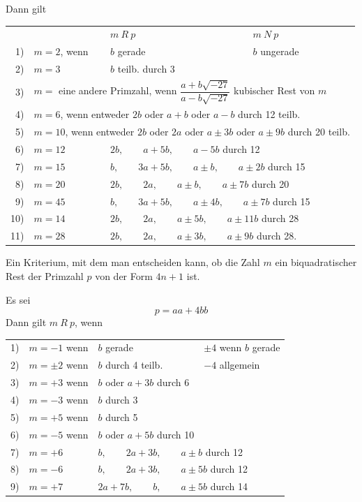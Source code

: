\noindent\unskip{}Dann gilt
\begin{center}\footnotesize\setlength{\tabcolsep}{3pt}
\begin{tabular}{@{}rlll@{}}
& &$m\ R\ p$&$m\ N\ p$\\
1)&$m=2$, wenn&$b$ gerade&$b$ ungerade\\
2)&$m=3$&$b$ teilb. durch 3&\\
3)&\multicolumn{3}{l}{$m={}$ eine andere Primzahl, wenn $\dfrac{a+b\sqrt{-27}}{a-b\sqrt{-27}}$ kubischer Rest von $m$}\\[5pt]
4)&\multicolumn{3}{l}{$m=6$, wenn entweder $2b$ oder $a+b$ oder $a-b$ durch 12 teilb.}\\
5)&\multicolumn{3}{l}{$m=10$, wenn entweder $2b$ oder $2a$ oder $a\pm3b$ oder $a\pm9b$ durch 20 teilb.}\\
6)&$m=12$&\multicolumn{2}{l}{$2b,\qquad a+5b,\qquad a-5b$ durch 12}\\
7)&$m=15$&\multicolumn{2}{l}{$b,\qquad 3a+5b,\qquad a\pm b,\qquad a\pm2b$ durch 15}\\
8)&$m=20$&\multicolumn{2}{l}{$2b,\qquad2a,\qquad a\pm b,\qquad a\pm7b$ durch 20}\\
9)&$m=45$&\multicolumn{2}{l}{$b,\qquad3a+5b,\qquad a\pm4b,\qquad a\pm7b$ durch 15}\\
10)&$m=14$&\multicolumn{2}{l}{$2b,\qquad2a,\qquad a\pm5b,\qquad a\pm11b$ durch 28}\\
11)&$m=28$&\multicolumn{2}{l}{$2b,\qquad2a,\qquad a\pm3b,\qquad a\pm9b$ durch 28.}
\end{tabular}\end{center}
\medskip
\par\noindent\hspace*{\parindent}Ein Kriterium, mit dem man entscheiden kann, ob die Zahl $m$ ein biquadratischer Rest der Primzahl $p$ von der Form $4n+1$ ist.

Es sei
\[p=aa+4bb\]
\noindent Dann gilt $m\ R\ p$, wenn
\begin{center}\small\setlength{\tabcolsep}{3pt}\begin{tabular}{@{}rlll@{}}
1)&$m=-1$ wenn&$b$ gerade&$\pm4$ wenn $b$ gerade\\
2)&$m=\pm2$ wenn&$b$ durch 4 teilb.&$-4$ allgemein\\
3)&$m=+3$ wenn&$b$ oder $a+3b$ durch 6&\\
4)&$m=-3$ wenn&$b$ durch 3&\\
5)&$m=+5$ wenn&$b$ durch 5&\\
6)&$m=-5$ wenn&$b$ oder $a+5b$ durch 10&\\
7)&$m=+6$&\multicolumn{2}{l}{$b,\qquad2a+3b,\qquad a\pm b$ durch 12}\\
8)&$m=-6$&\multicolumn{2}{l}{$b,\qquad2a+3b,\qquad a\pm5b$ durch 12}\\
9)&$m=+7$&\multicolumn{2}{l}{$2a+7b,\qquad b,\qquad a\pm5b$ durch 14}
\end{tabular}\end{center}
